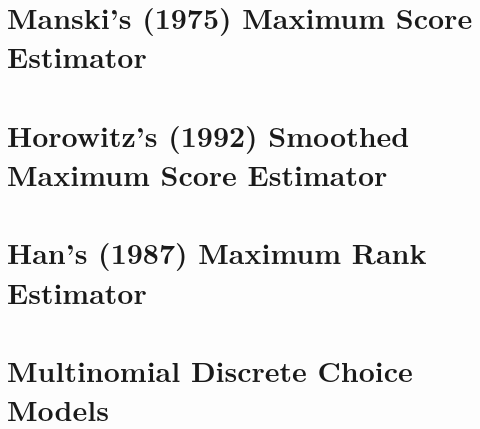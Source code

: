 \documentclass[xcolor=svgnames,dvipdfmx,cjk]{beamer}
\theoremstyle{example}
\begin{document}
  
  
\section{Manski's (1975) Maximum Score Estimator}
  
  
  
  
  
  
  


  
\section{Horowitz's (1992) Smoothed Maximum Score Estimator}
  
  
  
  
  
  
  
  
  
  
\section{Han's (1987) Maximum Rank Estimator}
  
  
  



  
  
  
  
  
\section{Multinomial Discrete Choice Models}
  
  
  
  
  
  
  
\end{document}
